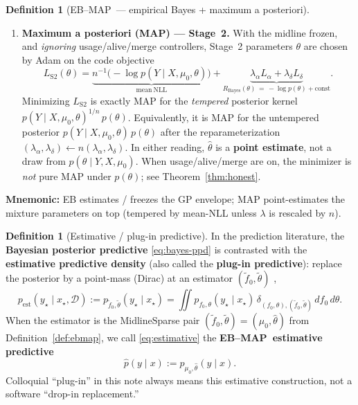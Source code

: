 \documentclass[11pt,a4paper]{article}
\theoremstyle{plain}
\theoremstyle{definition}
\newtheorem{definition}[theorem]{Definition}
\theoremstyle{remark}
\newcommand{\D}{\mathcal{D}}
\newcommand{\tht}{\theta}
\newcommand{\EBMAP}{EB--MAP}
\begin{document}
\begin{definition}[\EBMAP\ --- empirical Bayes + maximum a posteriori]
\begin{enumerate}[label=(\roman*),leftmargin=1.4em,itemsep=0.35em]
  \item \textbf{Maximum a posteriori (MAP) --- Stage~2.}
        With the midline frozen, and \emph{ignoring} usage/alive/merge controllers,
        Stage~2 parameters \(\tht\) are chosen by Adam on the code objective
        \[
          L_{\mathrm{S2}}(\tht)
          =
          \underbrace{
            n^{-1}\bigl(-\log p(Y\mid X,\mu_0,\tht)\bigr)
          }_{\mathrm{mean\ NLL}}
          +
          \underbrace{
            \lambda_\alpha L_\alpha+\lambda_\delta L_\delta
          }_{R_{\mathrm{Bayes}}(\tht)\,=\,-\log p(\tht)+\mathrm{const}}.
        \]
        Minimizing \(L_{\mathrm{S2}}\) is exactly MAP for the \emph{tempered} posterior
        kernel \(p(Y\mid X,\mu_0,\tht)^{1/n}\,p(\tht)\).
        Equivalently, it is MAP for the untempered posterior
        \(p(Y\mid X,\mu_0,\tht)\,p(\tht)\) after the reparameterization
        \((\lambda_\alpha,\lambda_\delta)\leftarrow n(\lambda_\alpha,\lambda_\delta)\).
        In either reading, \(\hat\tht\) is a \textbf{point estimate}, not a draw from
        \(p(\tht\mid Y,X,\mu_0)\).
        When usage/alive/merge are on, the minimizer is \emph{not} pure MAP under
        \(p(\tht)\); see Theorem~\ref{thm:honest}.
\end{enumerate}
\textbf{Mnemonic:} EB estimates / freezes the GP envelope; MAP point-estimates the
mixture parameters on top (tempered by mean-NLL unless \(\lambda\) is rescaled by \(n\)).
\end{definition}

\begin{definition}[Estimative / plug-in predictive]
\label{def:estimative}
In the prediction literature, the \textbf{Bayesian posterior predictive}
\eqref{eq:bayes-ppd} is contrasted with the \textbf{estimative predictive density}
(also called the \textbf{plug-in predictive}): replace the posterior by a
point-mass (Dirac) at an estimator \((\tilde f_0,\tilde\tht)\)
\citep{Aitchison1975,BernardoSmith1994},
\begin{equation}
  p_{\mathrm{est}}(y_\star\mid x_\star,\D)
  :=
  p_{\tilde f_0,\tilde\tht}(y_\star\mid x_\star)
  =
  \iint
  p_{f_0,\tht}(y_\star\mid x_\star)\,
  \delta_{(f_0,\tht),(\tilde f_0,\tilde\tht)}
  \,df_0\,d\tht.
  \label{eq:estimative}
\end{equation}
When the estimator is the MidlineSparse pair
\((\tilde f_0,\tilde\tht)=(\mu_0,\hat\tht)\) from Definition~\ref{def:ebmap},
we call \eqref{eq:estimative} the
\textbf{\EBMAP\ estimative predictive}
\[
  \hat p(y\mid x)
  :=
  p_{\mu_0,\hat\tht}(y\mid x).
\]
Colloquial ``plug-in'' in this note always means this estimative construction,
not a software ``drop-in replacement.''
\end{definition}
\end{document}
